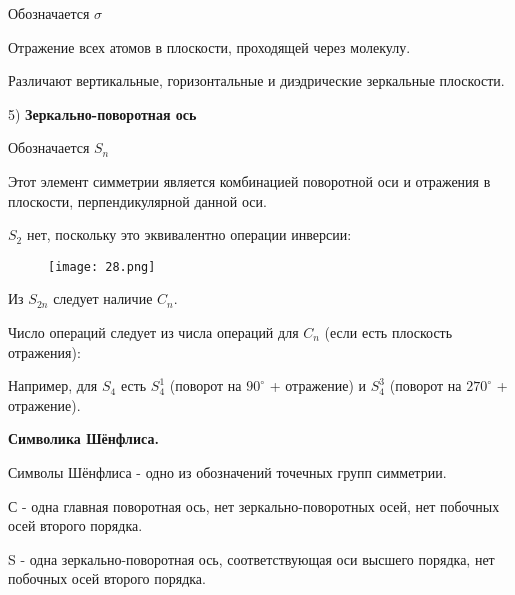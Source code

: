 Обозначается $\sigma$

\par\smallskip

Отражение всех атомов в плоскости, проходящей через
молекулу.

\par\smallskip
Различают вертикальные, горизонтальные и диэдрические
зеркальные плоскости.

\par\smallskip

5) \textbf{Зеркально-поворотная ось}

\par\smallskip 

Обозначается $S_n$

\par\smallskip

Этот элемент симметрии является комбинацией поворотной
оси и отражения в плоскости, перпендикулярной данной оси.

\par\smallskip

$S_2$ нет, поскольку это эквивалентно операции инверсии:

\begin{figure}[H]
	\centering
	{\texttt{[image: 28.png]}}
\end{figure}

Из $S_{2n}$ следует наличие $C_n$.

\par\smallskip

	
Число операций следует из числа операций для $C_n$ (если есть
плоскость отражения):

\par\smallskip

Например, для $S_4$ есть $S_4^1$ (поворот на $90^\circ$ + отражение)	и $S_4^3$ (поворот на $270^\circ$ + отражение).

\begin{center}
\textbf{Символика Шёнфлиса.}
\end{center}	

Символы Шёнфлиса - одно из обозначений точечных групп
симметрии.

\par\smallskip

С - одна главная поворотная ось, нет зеркально-поворотных осей,
нет побочных осей второго порядка.

\par\smallskip


S - одна зеркально-поворотная ось, соответствующая оси высшего
порядка, нет побочных осей второго порядка.

